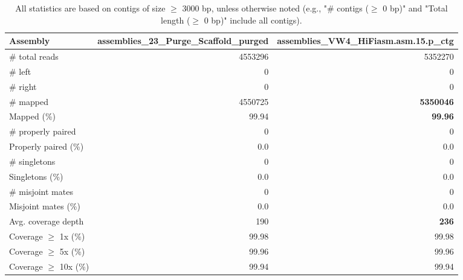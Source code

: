 \documentclass[12pt,a4paper]{article}
\begin{document}
\begin{table}[ht]
\begin{center}
\caption{All statistics are based on contigs of size $\geq$ 3000 bp, unless otherwise noted (e.g., "\# contigs ($\geq$ 0 bp)" and "Total length ($\geq$ 0 bp)" include all contigs).}
\begin{tabular}{|l*{2}{|r}|}
\hline
Assembly & assemblies\_23\_Purge\_Scaffold\_purged & assemblies\_VW4\_HiFiasm.asm.15.p\_ctg \\ \hline
\# total reads & 4553296 & 5352270 \\ \hline
\# left & 0 & 0 \\ \hline
\# right & 0 & 0 \\ \hline
\# mapped & 4550725 & {\bf 5350046} \\ \hline
Mapped (\%) & 99.94 & {\bf 99.96} \\ \hline
\# properly paired & 0 & 0 \\ \hline
Properly paired (\%) & 0.0 & 0.0 \\ \hline
\# singletons & 0 & 0 \\ \hline
Singletons (\%) & 0.0 & 0.0 \\ \hline
\# misjoint mates & 0 & 0 \\ \hline
Misjoint mates (\%) & 0.0 & 0.0 \\ \hline
Avg. coverage depth & 190 & {\bf 236} \\ \hline
Coverage $\geq$ 1x (\%) & 99.98 & 99.98 \\ \hline
Coverage $\geq$ 5x (\%) & 99.96 & 99.96 \\ \hline
Coverage $\geq$ 10x (\%) & 99.94 & 99.94 \\ \hline
\end{tabular}
\end{center}
\end{table}
\end{document}
